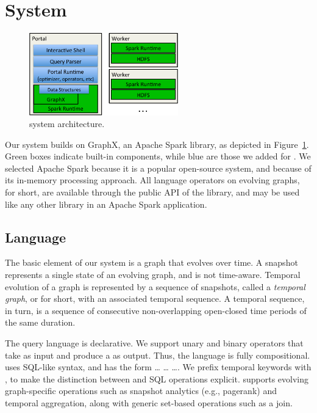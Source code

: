 \section{System}
\label{sec:sys}

\begin{figure}[t!]
\begin{center}
\includegraphics[height=1.4in]{figs/architecture.pdf}
\caption{\ql system architecture.}
\label{fig:arch}
\end{center}
\end{figure}

Our \ql system builds on GraphX, an Apache Spark library, as depicted
in Figure~\ref{fig:arch}.  Green boxes indicate built-in components,
while blue are those we added for \ql.  We selected Apache Spark
because it is a popular open-source system, and because of its
in-memory processing approach.  All language operators on evolving
graphs, \tg for short, are available through the public API of the \ql
library, and may be used like any other library in an Apache Spark
application.

\subsection{Language}
\label{sec:language}

The basic element of our system is a graph that evolves over time.  A
snapshot represents a single state of an evolving graph, and is not
time-aware.  Temporal evolution of a graph is represented by a
sequence of snapshots, called a {\em temporal graph}, or \tg for
short, with an associated temporal sequence.  A temporal sequence, in
turn, is a sequence of consecutive non-overlapping open-closed time
periods of the same duration.

The \ql query language is declarative.  We support unary and binary
operators that take \tgs as input and produce a \tg as output.  Thus,
the language is fully compositional.  \ql uses SQL-like syntax, and
has the form  \ldots {} \ldots {}
\ldots {}.  We prefix temporal keywords with , to
make the distinction between \ql and SQL operations explicit.  \ql
supports evolving graph-specific operations such as snapshot analytics
(e.g., pagerank) and temporal aggregation, along with generic
set-based operations such as a join.

